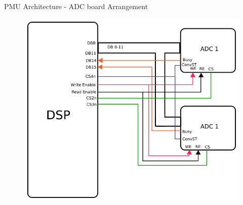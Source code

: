 \documentclass{beamer}
\begin{document}
\begin{frame}{PMU Architecture - ADC board Arrangement}
\begin{figure}
\includegraphics[scale= 0.4]{fig/ADC_board.png}
\end{figure}
\end{frame}
\end{document}
